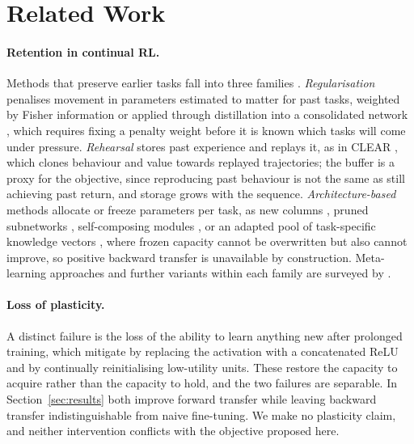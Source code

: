 %

\section{Related Work}
\label{sec:related}

\paragraph{Retention in continual RL.}
Methods that preserve earlier tasks fall into three families
\citep{pan2025survey}. \emph{Regularisation} penalises movement in parameters
estimated to matter for past tasks, weighted by Fisher information
\citep{kirkpatrick2017ewc} or applied through distillation into a consolidated
network \citep{schwarz2018progress}, which requires fixing a penalty weight
before it is known which tasks will come under pressure. \emph{Rehearsal}
stores past experience and replays it, as in CLEAR \citep{rolnick2019clear},
which clones behaviour and value towards replayed trajectories; the buffer is a
proxy for the objective, since reproducing past behaviour is not the same as
still achieving past return, and storage grows with the sequence.
\emph{Architecture-based} methods allocate or freeze parameters per task, as
new columns \citep{rusu2016progressive}, pruned subnetworks
\citep{mallya2018packnet}, self-composing modules \citep{malagon2024componet},
or an adapted pool of task-specific knowledge vectors \citep{hu2025ckarl},
where frozen capacity cannot be overwritten but also cannot improve, so
positive backward transfer is unavailable by construction. Meta-learning
approaches \citep{finn2017maml} and further variants within each family are
surveyed by \citet{pan2025survey}.

\paragraph{Loss of plasticity.}
A distinct failure is the loss of the ability to learn anything new after
prolonged training, which \citet{abbas2023plasticity} mitigate by replacing the
activation with a concatenated ReLU and \citet{dohare2024plasticity} by
continually reinitialising low-utility units. These restore the capacity to
acquire rather than the capacity to hold, and the two failures are separable.
In Section~\ref{sec:results} both improve forward transfer while leaving
backward transfer indistinguishable from naive fine-tuning. We make no
plasticity claim, and neither intervention conflicts with the objective
proposed here.

